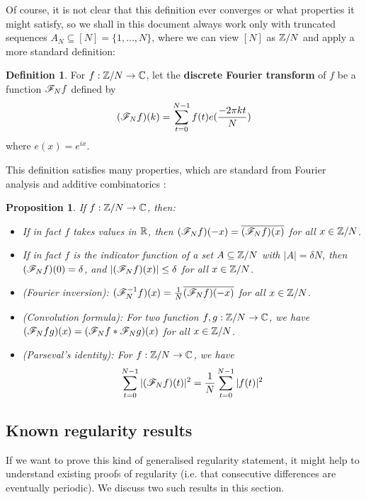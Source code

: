 \documentclass{article}
\newtheorem{proposition}[theorem]{Proposition}
\theoremstyle{definition}
\newtheorem{definition}{Definition}
\theoremstyle{remark}
\numberwithin{equation}{section}
\begin{document}
Of course, it is not clear that this definition ever converges or what
properties it might satisfy, so we shall in this document always work
only with truncated sequences $A_N \subseteq [N] = \{1, \ldots, N\}$,
where we can view $[N]$ as $\mathbb{Z}/N$ and apply a more standard
definition:

\begin{definition}
  For $f : \mathbb{Z}/N \to \mathbb{C}$, let the \textbf{discrete Fourier transform}
  of $f$ be a function $\mathscr{F}_N f$ defined by
  \[(\mathscr{F}_N f)(k) = \sum_{t=0}^{N-1} f(t) e(\frac{-2\pi k t}{N})\]
  where $e(x) = e^{ix}$.
\end{definition}

This definition satisfies many properties, which are standard from
Fourier analysis and additive combinatorics \cite{tao:cup2006}:

\begin{proposition}
If $f : \mathbb{Z}/N \to \mathbb{C}$, then: 

\begin{itemize}
\item If in fact $f$ takes values in $\mathbb{R}$, then
  $(\mathscr{F}_N f)(-x) = \overline{(\mathscr{F}_N f)(x)}$ for all $x \in \mathbb{Z}/N$.

\item If in fact $f$ is the indicator function of a set
  $A \subseteq \mathbb{Z}/N$ with $|A| = \delta N$, then
  $(\mathscr{F}_N f)(0) = \delta$, and $|(\mathscr{F}_N f)(x)| \leq \delta$ for all
  $x \in \mathbb{Z}/N$.

\item (Fourier inversion):
  $(\mathscr{F}_N^{-1} f)(x) = \frac{1}{N} \overline{(\mathscr{F}_N f)(-x)}$ for all
  $x \in \mathbb{Z}/N$.

\item (Convolution formula): For two function $f, g : \mathbb{Z}/N \to \mathbb{C}$, we
  have $(\mathscr{F}_N fg)(x) = (\mathscr{F}_N f \ast \mathscr{F}_N g)(x)$ for all
  $x \in \mathbb{Z}/N$.

\item (Parseval's identity): For $f : \mathbb{Z}/N \to \mathbb{C}$, we
  have
  \[\sum_{t=0}^{N-1} |(\mathscr{F}_N f)(t)|^2 = \frac{1}{N} \sum_{t=0}^{N-1}
    |f(t)|^2\]
\end{itemize}
\end{proposition}

\subsection{Known regularity results}

If we want to prove this kind of generalised regularity statement, it
might help to understand existing proofs of regularity (i.e. that
consecutive differences are eventually periodic).  We discuss two such
results in this section.
\end{document}
